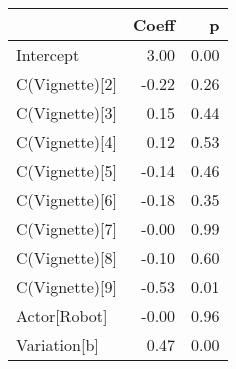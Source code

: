 \begin{tabular}{lrr}
\toprule
{} &  Coeff &    p \\
\midrule
Intercept        &   3.00 & 0.00 \\
C(Vignette)[2] &  -0.22 & 0.26 \\
C(Vignette)[3] &   0.15 & 0.44 \\
C(Vignette)[4] &   0.12 & 0.53 \\
C(Vignette)[5] &  -0.14 & 0.46 \\
C(Vignette)[6] &  -0.18 & 0.35 \\
C(Vignette)[7] &  -0.00 & 0.99 \\
C(Vignette)[8] &  -0.10 & 0.60 \\
C(Vignette)[9] &  -0.53 & 0.01 \\
Actor[Robot]   &  -0.00 & 0.96 \\
Variation[b]   &   0.47 & 0.00 \\
\bottomrule
\end{tabular}
